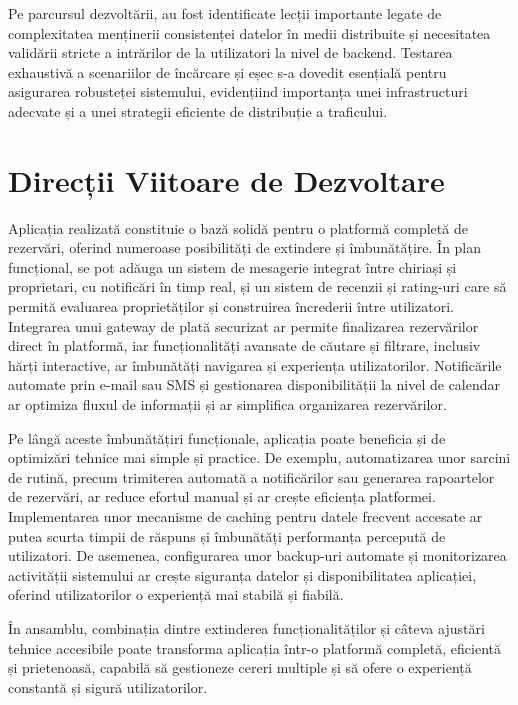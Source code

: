 \documentclass[12pt, a4paper, oneside, romanian]{teza-upb}
\begin{document}
Pe parcursul dezvoltării, au fost identificate lecții importante legate de complexitatea menținerii consistenței datelor în medii distribuite și necesitatea validării stricte a intrărilor de la utilizatori la nivel de backend. Testarea exhaustivă a scenariilor de încărcare și eșec s-a dovedit esențială pentru asigurarea robusteței sistemului, evidențiind importanța unei infrastructuri adecvate și a unei strategii eficiente de distribuție a traficului.

\section{Direcții Viitoare de Dezvoltare}
Aplicația realizată constituie o bază solidă pentru o platformă completă de rezervări, oferind numeroase posibilități de extindere și îmbunătățire. În plan funcțional, se pot adăuga un sistem de mesagerie integrat între chiriași și proprietari, cu notificări în timp real, și un sistem de recenzii și rating-uri care să permită evaluarea proprietăților și construirea încrederii între utilizatori. Integrarea unui gateway de plată securizat ar permite finalizarea rezervărilor direct în platformă, iar funcționalități avansate de căutare și filtrare, inclusiv hărți interactive, ar îmbunătăți navigarea și experiența utilizatorilor. Notificările automate prin e-mail sau SMS și gestionarea disponibilității la nivel de calendar ar optimiza fluxul de informații și ar simplifica organizarea rezervărilor.

Pe lângă aceste îmbunătățiri funcționale, aplicația poate beneficia și de optimizări tehnice mai simple și practice. De exemplu, automatizarea unor sarcini de rutină, precum trimiterea automată a notificărilor sau generarea rapoartelor de rezervări, ar reduce efortul manual și ar crește eficiența platformei. Implementarea unor mecanisme de caching pentru datele frecvent accesate ar putea scurta timpii de răspuns și îmbunătăți performanța percepută de utilizatori. De asemenea, configurarea unor backup-uri automate și monitorizarea activității sistemului ar crește siguranța datelor și disponibilitatea aplicației, oferind utilizatorilor o experiență mai stabilă și fiabilă.

În ansamblu, combinația dintre extinderea funcționalităților și câteva ajustări tehnice accesibile poate transforma aplicația într-o platformă completă, eficientă și prietenoasă, capabilă să gestioneze cereri multiple și să ofere o experiență constantă și sigură utilizatorilor.
\end{document}
